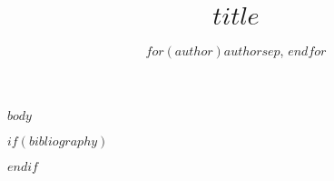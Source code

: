 \documentclass[a4paper]{article}
\title{\Large $title$}
\author{$for(author)$$author$$sep$, $endfor$}
\begin{document}
\maketitle

$body$

$if(bibliography)$

$endif$
\end{document}
